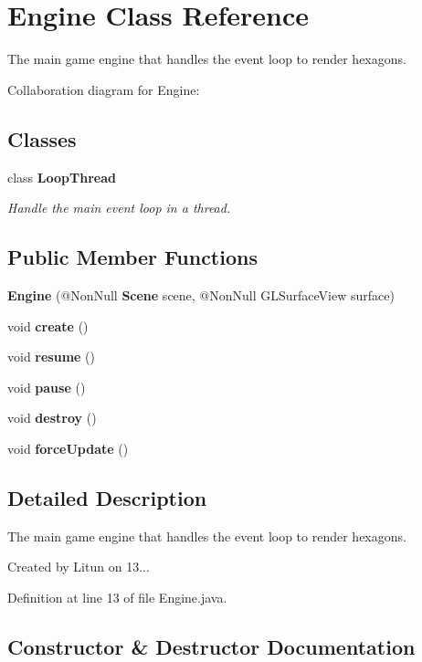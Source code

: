 \section{Engine Class Reference}
\label{classsf_1_1unitingtwist_1_1_engine}


The main game engine that handles the event loop to render hexagons.  




Collaboration diagram for Engine\+:
\subsection*{Classes}
\begin{DoxyCompactItemize}
\item 
class {\bfseries Loop\+Thread}
\begin{DoxyCompactList}\small\item\em Handle the main event loop in a thread. \end{DoxyCompactList}\end{DoxyCompactItemize}
\subsection*{Public Member Functions}
\begin{DoxyCompactItemize}
\item 
\textbf{ Engine} (@Non\+Null \textbf{ Scene} scene, @Non\+Null G\+L\+Surface\+View surface)
\item 
void \textbf{ create} ()
\item 
void \textbf{ resume} ()
\item 
void \textbf{ pause} ()
\item 
void \textbf{ destroy} ()
\item 
void \textbf{ force\+Update} ()
\end{DoxyCompactItemize}


\subsection{Detailed Description}
The main game engine that handles the event loop to render hexagons. 

Created by Litun on 13... 

Definition at line 13 of file Engine.\+java.



\subsection{Constructor \& Destructor Documentation}
\mbox{\label{classsf_1_1unitingtwist_1_1_engine_aeec39154ee36ea97df26b53276e8d905}} 
